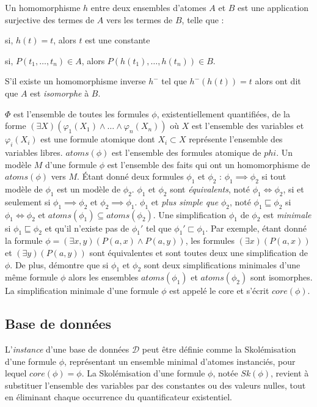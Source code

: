 Un homomorphisme $h$ entre deux ensembles d'atomes $A$ et $B$ est une application surjective des termes de $A$ vers les termes de $B$, telle que :
\begin{enumerate*}[label=(\roman*)]
    \item si, $h(t) = t$, alors $t$ est une constante
    \item si, $P(t_1, \dots, t_n) \in A$, alors $P(h(t_1), \dots, h(t_n)) \in B$.
\end{enumerate*}
S'il existe un homomorphisme inverse $h^-$ tel que $h^-(h(t)) = t$ alors ont dit que $A$ est \emph{isomorphe} à $B$.

$\Phi$ est l'ensemble de toutes les formules $\phi$, existentiellement quantifiées, de la forme $(\exists X)(\varphi_1(X_1) \land \dots \land \varphi_n(X_n))$ où $X$ est l'ensemble des variables et $\varphi_i(X_i)$ est une formule atomique dont $X_i \subset X$ représente l'ensemble des variables libres.
$atoms(\phi)$ est l'ensemble des formules atomique de $phi$.
Un modèle $M$ d'une formule $\phi$ est l'ensemble des faits qui ont un homomorphisme de $atoms(\phi)$ vers $M$.
Étant donné deux formules $\phi_1$ et $\phi_2$ : $\phi_1 \implies \phi_2$ si tout modèle de $\phi_1$ est un modèle de $\phi_2$.
$\phi_1$ et $\phi_2$ sont \emph{équivalents}, noté $\phi_1 \iff \phi_2$, si et seulement si $\phi_1 \implies \phi_2$ et $\phi_2 \implies \phi_1$.
$\phi_1$ et \emph{plus simple que} $\phi_2$, noté $\phi_1 \sqsubseteq \phi_2$ si $\phi_1 \iff \phi_2$ et $atoms(\phi_1) \subseteq atoms(\phi_2)$.
Une simplification $\phi_1$ de $\phi_2$ est \emph{minimale} si $\phi_1 \sqsubseteq \phi_2$ et qu'il n'existe pas de $\phi_1'$ tel que $\phi_1' \sqsubset \phi_1$.
Par exemple, étant donné la formule $\phi = (\exists x, y)(P(a, x) \land P(a, y))$, les formules $(\exists x)(P(a, x))$ et $(\exists y)(P(a, y))$ sont équivalentes et sont toutes deux une simplification de $\phi$.
De plus, \cite{chabinConsistentUpdatingDatabases2020} démontre que si $\phi_1$ et $\phi_2$ sont deux simplifications minimales d'une même formule $\phi$ alors les ensembles $atoms(\phi_1)$ et $atoms(\phi_2)$ sont isomorphes.
La simplification minimale d'une formule $\phi$ est appelé le \gls{core} et s'écrit $core(\phi)$.

\subsection{Base de données}
\label{sec:update:pre:db}

L'\emph{instance} d'une base de données $\mathcal{D}$ peut être définie comme la Skolémisation d'une formule $\phi$, représentant un ensemble minimal d'atomes instanciés, pour lequel $core(\phi) = \phi$.
La Skolémisation d'une formule $\phi$, notée $Sk(\phi)$, revient à substituer l'ensemble des variables par des constantes ou des valeurs nulles, tout en éliminant chaque occurrence du quantificateur existentiel.

